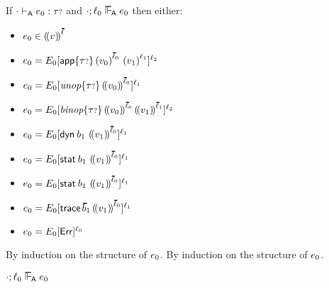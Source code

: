 \begin{lemma}\label{A-label-decomposition}
  If\/ ${\cdot} \vdash_{\mathsf{A}} e_0 : {\tau{\scriptstyle ?}}$
  and\/ $\snil; \sowner_0 \sWLA \sexpr_0$
  then either:
  \begin{itemize}
    \item
      $\sexpr_0 \in \obbars{\svalue}{\sownerlist}$
    \item
      $\sexpr_0 \eeq \ctx_0\ctxbars{\eapp{\toptional}{\obars{\svalue_0}{\sownerlist_0}}{\obars{\svalue_1}{\sowner_1}}}{\sowner_2}$
    \item
      $\sexpr_0 \eeq \ctx_0\ctxbars{\eunopt{\stoptional}{\obbars{\svalue_0}{\sownerlist_0}}}{\sowner_1}$
    \item
      $\sexpr_0 \eeq \ctx_0\ctxbars{\ebinopt{\stoptional}{\obbars{\svalue_0}{\sownerlist_0}}{\obbars{\svalue_1}{\sownerlist_1}}}{\sowner_2}$
    \item
      $\sexpr_0 \eeq \ctx_0\ctxbars{\edynb{\sbnd_1}{\obbars{\svalue_1}{\sownerlist_0}}}{\sowner_1}$
    \item
      $\sexpr_0 \eeq \ctx_0\ctxbars{\estab{\sbnd_1}{\obbars{\svalue_1}{\sownerlist_0}}}{\sowner_1}$
    \item
      $\sexpr_0 \eeq \ctx_0\ctxbars{\estab{\sbnd_1}{\obbars{\svalue_1}{\sownerlist_0}}}{\sowner_1}$
    \item
      $\sexpr_0 \eeq \ctx_0\ctxbars{\eprehist{\sblist_1}{\obbars{\svalue_1}{\sownerlist_0}}}{\sowner_1}$
    \item
      $e_0 = E_0[\mathsf{Err}]^{\ell_0}$
  \end{itemize}
\end{lemma}{
  \newcommand{\shortproof}{By induction on the structure of $\sexpr_0$.}
\begin{lamportproof*}
  \shortproof
\mainproof\leavevmode
  \shortproof

    \begin{pfproof}
      \absurdstep
        \begin{pfproof}
          $\snil; \sowner_0 \sWLA \sexpr_0$
        \end{pfproof}
    \end{pfproof}

    \begin{pfproof}
      \qedstep
    \end{pfproof}


\end{lamportproof*}}
